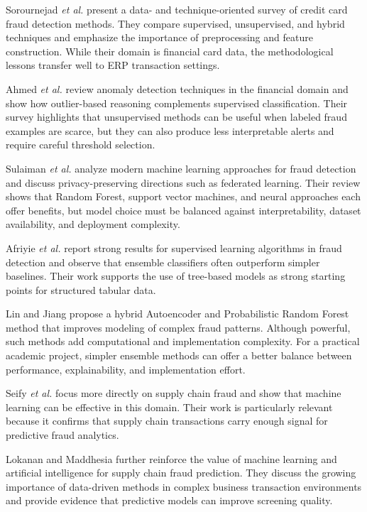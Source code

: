 \documentclass[a4paper,12pt]{article}
\begin{document}
Sorournejad \textit{et al.} \cite{sorournejad2016survey} present a data- and technique-oriented survey of credit card fraud detection methods. They compare supervised, unsupervised, and hybrid techniques and emphasize the importance of preprocessing and feature construction. While their domain is financial card data, the methodological lessons transfer well to ERP transaction settings.

Ahmed \textit{et al.} \cite{ahmed2016anomaly} review anomaly detection techniques in the financial domain and show how outlier-based reasoning complements supervised classification. Their survey highlights that unsupervised methods can be useful when labeled fraud examples are scarce, but they can also produce less interpretable alerts and require careful threshold selection.

Sulaiman \textit{et al.} \cite{sulaiman2022review} analyze modern machine learning approaches for fraud detection and discuss privacy-preserving directions such as federated learning. Their review shows that Random Forest, support vector machines, and neural approaches each offer benefits, but model choice must be balanced against interpretability, dataset availability, and deployment complexity.

Afriyie \textit{et al.} \cite{afriyie2023supervised} report strong results for supervised learning algorithms in fraud detection and observe that ensemble classifiers often outperform simpler baselines. Their work supports the use of tree-based models as strong starting points for structured tabular data.

Lin and Jiang \cite{lin2021autoencoder} propose a hybrid Autoencoder and Probabilistic Random Forest method that improves modeling of complex fraud patterns. Although powerful, such methods add computational and implementation complexity. For a practical academic project, simpler ensemble methods can offer a better balance between performance, explainability, and implementation effort.

Seify \textit{et al.} \cite{seify2022supply} focus more directly on supply chain fraud and show that machine learning can be effective in this domain. Their work is particularly relevant because it confirms that supply chain transactions carry enough signal for predictive fraud analytics.

Lokanan and Maddhesia \cite{lokanan2025supply} further reinforce the value of machine learning and artificial intelligence for supply chain fraud prediction. They discuss the growing importance of data-driven methods in complex business transaction environments and provide evidence that predictive models can improve screening quality.
\end{document}
